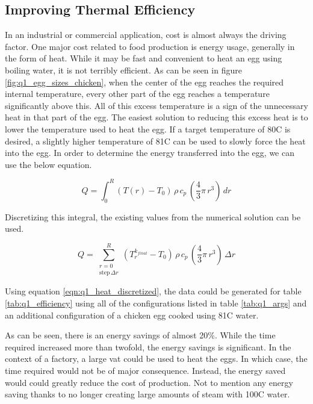 \documentclass[12pt]{article}
\begin{document}
\subsection{Improving Thermal Efficiency}

In an industrial or commercial application, cost is almost always the driving factor. One major cost related to food production is energy usage, generally in the form of heat. While it may be fast and convenient to heat an egg using boiling water, it is not terribly efficient. As can be seen in figure \ref{fig:q1_egg_sizes_chicken}, when the center of the egg reaches the required internal temperature, every other part of the egg reaches a temperature significantly above this. All of this excess temperature is a sign of the unnecessary heat in that part of the egg. The easiest solution to reducing this excess heat is to lower the temperature used to heat the egg. If a target temperature of 80\textdegree C is desired, a slightly higher temperature of 81\textdegree C can be used to slowly force the heat into the egg. In order to determine the energy transferred into the egg, we can use the below equation.

\begin{equation}
    \label{eqn:q1_heat_absorbed}
    Q = \int_0^R (T(r) - T_0) \, \rho \, c_p \, \left( \frac{4}{3} \pi \, r^3 \right) \, dr
\end{equation}

\noindent Discretizing this integral, the existing values from the numerical solution can be used.

\begin{equation}
    \label{eqn:q1_heat_discretized}
    Q = \sum_{\substack{r=0 \\ \text{step} \, \Delta r}}^{R} (T_r^{k_{final}} - T_0) \, \rho \, c_p \, \left( \frac{4}{3} \pi \, r^3 \right) \, \Delta r
\end{equation}

\noindent Using equation \ref{eqn:q1_heat_discretized}, the data could be generated for table \ref{tab:q1_efficiency} using all of the configurations listed in table \ref{tab:q1_args} and an additional configuration of a chicken egg cooked using 81\textdegree C water.

As can be seen, there is an energy savings of almost 20\%. While the time required increased more than twofold, the energy savings is significant. In the context of a factory, a large vat could be used to heat the eggs. In which case, the time required would not be of major consequence. Instead, the energy saved would could greatly reduce the cost of production. Not to mention any energy saving thanks to no longer creating large amounts of steam with 100\textdegree C water.
\end{document}
